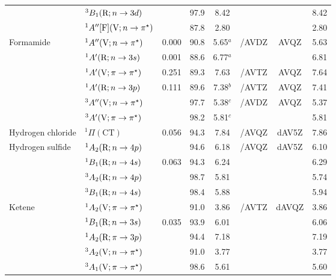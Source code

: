 \begin{tabular}{llcccccc}
                        &$^3B_1 (\mathrm{R};n \rightarrow 3d)$ 						&		&97.9 &8.42		&			&			&8.42	\\
                        &$^1A^{\prime\prime} [\mathrm{F}] (\mathrm{V};n \rightarrow \pi^\star)$			&		&87.8 &2.80		&			&			&2.80	\\
      Formamide	&$^1A^{\prime\prime} (\mathrm{V};n \rightarrow \pi^\star)$					&0.000	&90.8 &5.65$^a$	&{\exCI}/AVDZ& AVQZ		&5.63	\\
                        &$^1A^\prime (\mathrm{R};n \rightarrow 3s)$							&0.001	&88.6 &6.77$^a$	&			&			&6.81	\\
                        &$^1A^\prime (\mathrm{V};\pi \rightarrow \pi^\star)$					&0.251	&89.3 &7.63		&{\exCI}/AVTZ & AVQZ		&7.64	\\
                        &$^1A^\prime (\mathrm{R};n \rightarrow 3p)$							&0.111	&89.6 &7.38$^b$	&{\CCSDT}/AVTZ& AVQZ		&7.41	\\
                        &$^3A^{\prime\prime} (\mathrm{V};n \rightarrow \pi^\star)$					&		&97.7 &5.38$^c$	&{\exCI}/AVDZ& AVQZ		&5.37	\\
                        &$^3A^\prime (\mathrm{V};\pi \rightarrow \pi^\star)$					&		&98.2 &5.81$^c$	&			&			&5.81	\\
      Hydrogen chloride	 & $^1\Pi (\mathrm{CT})$							&0.056	&94.3 &7.84		& {\exCI}/AVQZ &dAV5Z		&7.86	\\	
      Hydrogen sulfide &$^1A_2 (\mathrm{R};n \rightarrow 4p)$ 						&		&94.6 &6.18		& {\exCI}/AVQZ &dAV5Z		&6.10	\\
                        &$^1B_1 (\mathrm{R};n \rightarrow 4s)$ 						& 0.063	&94.3 &6.24		&  			&			&6.29	\\
                        &$^3A_2 (\mathrm{R};n \rightarrow 4p)$ 						&		&98.7 &5.81		&  			&			&5.74	\\
                        &$^3B_1 (\mathrm{R};n \rightarrow 4s)$ 						&		&98.4 &5.88		& 			&			&5.94	 \\
      Ketene		&$^1A_2 (\mathrm{V};\pi \rightarrow \pi^\star)$ 				&		&91.0 &3.86		&{\exCI}/AVTZ & dAVQZ		&3.86	\\
                        &$^1B_1 (\mathrm{R};n \rightarrow 3s)$ 						& 0.035	&93.9 &6.01		&			&			&6.06	\\
                        &$^1A_2 (\mathrm{R};\pi \rightarrow 3p)$ 						&		&94.4 &7.18		&			&			&7.19	\\
                        &$^3A_2 (\mathrm{V};n \rightarrow \pi^\star)$ 					&		&91.0 &3.77		&			&			&3.77	\\
                        &$^3A_1 (\mathrm{V};\pi \rightarrow \pi^\star)$ 				&		&98.6 &5.61		&			&			&5.60	\\

\end{tabular}
